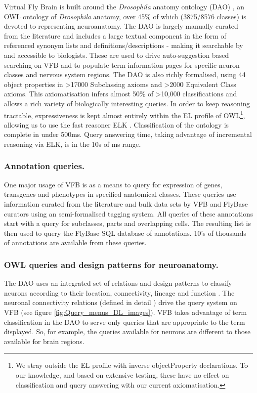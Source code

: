 \documentclass[runningheads,a4paper]{llncs}
\begin{document}
Virtual Fly Brain is built around the \textit{Drosophila} anatomy
ontology (DAO) \cite{Costa2013}, an OWL ontology of
\textit{Drosophila} anatomy, over 45\% of which (3875/8576 classes) is
devoted to representing neuroanatomy. The DAO is largely manually
curated from the literature and includes a large textual component in
the form of referenced synonym lists and definitions/descriptions -
making it searchable by and accessible to biologists.  These are used
to drive auto-suggestion based searching on VFB and to populate term
information pages for specific neuron classes and nervous system
regions. The DAO is also richly formalised, using 44 object properties
in \textgreater 17000 Subclassing axioms and \textgreater 2000
Equivalent Class axioms.  This axiomatisation infers almost 50\% of
\textgreater 10,000 classifications and allows a rich variety of
biologically interesting queries. In order to keep reasoning
tractable, expressiveness is kept almost entirely within the EL
profile of OWL\footnote{We stray outside the EL
  profile with inverse objectProperty declarations. To our
  knowledge, and based on extensive testing, these have no effect on classification and query
  answering with our current axiomatisation.}, allowing us to use the fast reasoner ELK \cite{kazakov2012elk}.
Classification of the ontology is complete in under 500ms.  Query
answering  time, taking advantage of incremental reasoning via ELK, is
in the 10s of ms range.

\subsubsection{Annotation queries.}

One major usage of VFB is as a means to query for expression of genes,
transgenes and phenotypes in specified anatomical classes.  These
queries use information curated from the literature and bulk data sets
by VFB and FlyBase curators using an semi-formalised tagging
system. All queries of these annotations start with a query for
subclasses, parts and overlapping cells.  The resulting list is then
used to query the FlyBase SQL database of annotations.  10's of
thousands of annotations are available from these queries.


\subsubsection{OWL queries and design patterns for neuroanatomy.}

The DAO uses an integrated set of relations and design patterns to
classify neurons according to their location, connectivity, lineage
and function \cite{pmid22180411,pmid22402613}.  The neuronal
connectivity relations (defined in detail \cite{pmid22402613})  drive the query system on VFB (see figure
\ref{fig:Query_menus_DL_images}). VFB takes advantage of term
classification in the DAO to serve only queries that are
appropriate to the term displayed. So, for example, the queries
available for neurons are different to those available for brain regions.
\end{document}
